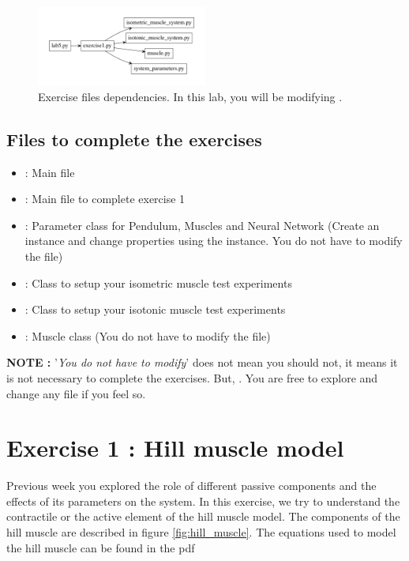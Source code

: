 \documentclass{cmc}
\begin{document}
\begin{figure}[ht]
  \centering \includegraphics[width=0.5\textwidth]{figures/files}
  \caption{\label{fig:files} Exercise files dependencies. In this
  lab, you will be modifying .}
\end{figure}

\subsection*{Files to complete the exercises}
\label{sec:intro}

\begin{itemize}
\item {} : Main file
\item {} : Main file to complete exercise 1
\item {} : Parameter class for Pendulum,
  Muscles and Neural Network (Create an instance and change properties
  using the instance. You do not have to modify the file)
\item {} : Class to setup your
  isometric muscle test experiments
\item {} : Class to setup your
  isotonic muscle test experiments
\item {} : Muscle class (You do not have to modify
  the file)
\end{itemize}

\textbf{NOTE : } '\textit{You do not have to modify}' does not mean
you should not, it means it is not necessary to complete the
exercises. But, . You are free to explore
and change any file if you feel so.


\section*{Exercise 1 : Hill muscle model}
\label{sec:question-2}

Previous week you explored the role of different passive components
and the effects of its parameters on the system. In this exercise, we
try to understand the contractile or the active element of the hill
muscle model. The components of the hill muscle are described in
figure \ref{fig:hill_muscle}. The equations used to model the hill
muscle can be found in the pdf 
\end{document}
